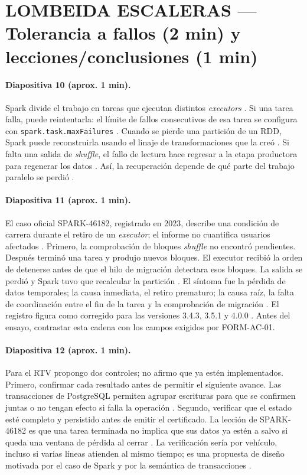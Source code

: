 \section*{LOMBEIDA ESCALERAS — Tolerancia a fallos (2 min) y lecciones/conclusiones (1 min)}
\paragraph{Diapositiva 10 (aprox. 1 min).}
Spark divide el trabajo en tareas que ejecutan distintos \textit{executors} \cite{sparkRddGuide}. Si una tarea falla, puede reintentarla: el límite de fallos consecutivos de esa tarea se configura con \texttt{spark.task.maxFailures} \cite{sparkConfiguration}. Cuando se pierde una partición de un RDD, Spark puede reconstruirla usando el linaje de transformaciones que la creó \cite{sparkRddGuide}. Si falta una salida de \textit{shuffle}, el fallo de lectura hace regresar a la etapa productora para regenerar los datos \cite{sparkFetchFailed}. Así, la recuperación depende de qué parte del trabajo paralelo se perdió \cite{sparkRddGuide,sparkFetchFailed}.

\paragraph{Diapositiva 11 (aprox. 1 min).}
El caso oficial SPARK-46182, registrado en 2023, describe una condición de carrera durante el retiro de un \textit{executor}; el informe no cuantifica usuarios afectados \cite{spark46182}. Primero, la comprobación de bloques \textit{shuffle} no encontró pendientes. Después terminó una tarea y produjo nuevos bloques. El executor recibió la orden de detenerse antes de que el hilo de migración detectara esos bloques. La salida se perdió y Spark tuvo que recalcular la partición \cite{spark46182}. El síntoma fue la pérdida de datos temporales; la causa inmediata, el retiro prematuro; la causa raíz, la falta de coordinación entre el fin de la tarea y la comprobación de migración \cite{spark46182}. El registro figura como corregido para las versiones 3.4.3, 3.5.1 y 4.0.0 \cite{spark46182}. Antes del ensayo, contrastar esta cadena con los campos exigidos por FORM-AC-01.

\paragraph{Diapositiva 12 (aprox. 1 min).}
Para el RTV propongo dos controles; no afirmo que ya estén implementados. Primero, confirmar cada resultado antes de permitir el siguiente avance. Las transacciones de PostgreSQL permiten agrupar escrituras para que se confirmen juntas o no tengan efecto si falla la operación \cite{postgresTransactions}. Segundo, verificar que el estado esté completo y persistido antes de emitir el certificado. La lección de SPARK-46182 es que una tarea terminada no implica que sus datos ya estén a salvo si queda una ventana de pérdida al cerrar \cite{spark46182}. La verificación sería por vehículo, incluso si varias líneas atienden al mismo tiempo; es una propuesta de diseño motivada por el caso de Spark y por la semántica de transacciones \cite{spark46182,postgresTransactions}.
